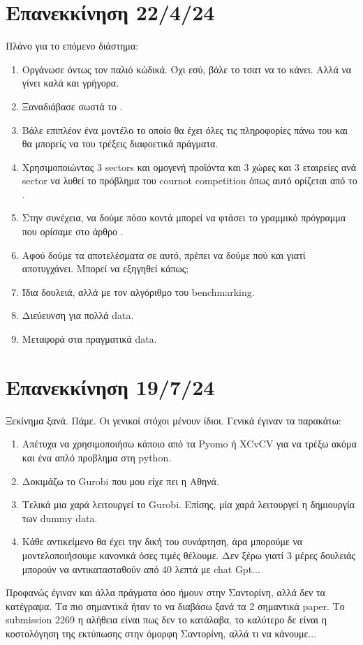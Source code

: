 \documentclass[a4paper,twoside,10pt]{article}
\begin{document}
	\section{Επανεκκίνηση 22/4/24}
Πλάνο για το επόμενο διάστημα:
\begin{enumerate}
	\item Οργάνωσε όντως τον παλιό κώδικά. Όχι εσύ, βάλε το τσατ να το κάνει. Αλλά να γίνει καλά και γρήγορα. 
	\item Ξαναδιάβασε σωστά το \cite{Allocating}.
	\item Βάλε επιπλέον ένα μοντέλο το οποίο θα έχει όλες τις πληροφορίες πάνω του και θα μπορείς να του τρέξεις διαφοετικά πράγματα. 
	\item Χρησιμοποιώντας 3 sectors και ομογενή προϊόντα και 3 χώρες και 3 εταιρείες ανά sector να λυθεί το πρόβλημα του cournot competition όπως αυτό ορίζεται από το \cite{Allocating}.
	\item Στην συνέχεια, να δούμε πόσο κοντά μπορεί να φτάσει το γραμμικό πρόγραμμα που ορίσαμε στο άρθρο \cite{First}. 
	\item Αφού δούμε τα αποτελέσματα σε αυτό, πρέπει να δούμε πού και γιατί αποτυγχάνει. Μπορεί να εξηγηθεί κάπως;
	\item Ίδια δουλειά, αλλά με τον αλγόριθμο του benchmarking. 
	\item Διεύευνση για πολλά data.
	\item Μεταφορά στα πραγματικά data. 
\end{enumerate}

\section{Επανεκκίνηση 19/7/24}
Ξεκίνημα ξανά. Πάμε. Οι γενικοί στόχοι μένουν ίδιοι. Γενικά έγιναν τα παρακάτω:
\begin{enumerate}
	\item Απέτυχα να χρησιμοποιήσω κάποιο από τα Pyomo ή XCvCV για να τρέξω ακόμα και ένα απλό προβλημα στη python.
	\item Δοκιμάζω το Gurobi που μου είχε πει η Αθηνά. 
	\item Τελικά μια χαρά λειτουργεί το Gurobi. Επίσης, μία χαρά λειτουργεί η δημιουργία των dummy data. 
	\item Κάθε αντικείμενο θα έχει την δική του συνάρτηση, άρα μπορούμε να μοντελοποιήσουμε κανονικά όσες τιμές θέλουμε. Δεν ξέρω γιατί 3 μέρες δουλειάς μπορούν να αντικατασταθούν από 40 λεπτά με chat Gpt...
\end{enumerate}
Προφανώς έγιναν και άλλα πράγματα όσο ήμουν στην Σαντορίνη, αλλά δεν τα κατέγραψα. Τα πιο σημαντικά ήταν το να διαβάσω ξανά τα 2 σημαντικά paper. Το submission 2269 η αλήθεια είναι πως δεν το κατάλαβα, το καλύτερο δε είναι η κοστολόγηση της εκτύπωσης στην όμορφη Σαντορίνη, αλλά τι να κάνουμε...
\end{document}
